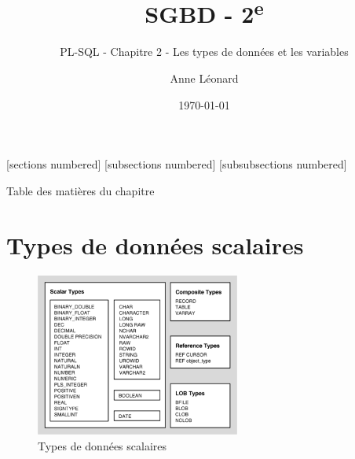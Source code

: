 \documentclass[10pt]{beamer}
\title{SGBD - 2\textsuperscript{e}}
\subtitle{PL-SQL - Chapitre 2 - Les types de données et les variables}
\date{\today}
\author{Anne Léonard}
\institute{Haute École de la Province de Liège}
\begin{document}
\maketitle

[sections numbered]
[subsections numbered]
[subsubsections numbered]
\begin{frame}[allowframebreaks]{Table des matières du chapitre}
    \tableofcontents[subsectionstyle=show/show/hide,subsubsectionstyle=show/show/hide,]
\end{frame}

\section{Types de données scalaires}
\tocss
\begin{frame}{\secname}
    \begin{figure}
        \begin{center}
            \includegraphics[width=0.60\textwidth]{../assets/img/scalar-type.png}
            \caption{Types de données scalaires}
        \end{center}
    \end{figure}
\end{frame}
\end{document}
